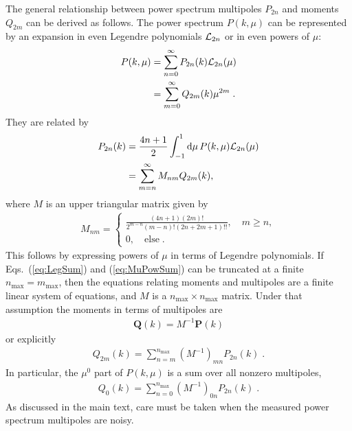 \documentclass[12pt,a4paper]{article}
\begin{document}
The general relationship between power spectrum multipoles $P_{2n}$ and moments $Q_{2m}$ can be derived as follows.
The power spectrum $P(k,\mu)$ can be represented by an expansion in even Legendre polynomials ${\cal L}_{2n}$ or in even powers of $\mu$:
\begin{align}
    P(k,\mu) &= \sum_{n=0}^\infty P_{2n}(k){\cal L}_{2n}(\mu) 
    \label{eq:LegSum}
    \\
    &= \sum_{m=0}^\infty Q_{2m}(k)\mu^{2m}\;.
    \label{eq:MuPowSum}
\end{align}
They are related by 
\begin{align}
    P_{2n}(k) &= \frac{4n+1}{2}\int_{-1}^1\mathrm{d} \mu\,P(k,\mu){\cal L}_{2n}(\mu)\\
    &= \sum_{m=n}^\infty M_{nm}Q_{2m}(k),
\end{align}
where $M$ is an upper triangular matrix given by
\begin{align}
    M_{nm} = 
    \begin{cases}
    \frac{(4n+1)(2m)!}{2^{m-n}(m-n)!(2n+2m+1)!!}, \quad m\ge n,\\
    0, \quad \mbox{else}\;.
    \end{cases}
\end{align}
This follows by expressing powers of $\mu$ in terms of Legendre polynomials.
If  Eqs.~(\ref{eq:LegSum}) and (\ref{eq:MuPowSum}) can be truncated at a finite $n_\mathrm{max}=m_\mathrm{max}$, then the equations relating moments and multipoles are a finite linear system of equations, and $M$ is a $n_\mathrm{max} \times n_\mathrm{max}$ matrix.
Under that assumption the moments in terms of multipoles are 
\begin{align}
    \mathbf{Q}(k) = M^{-1} \mathbf{P}(k)
\end{align}
or explicitly
\begin{align}
    Q_{2m}(k) = \sum_{n=m}^{n_\mathrm{max}} (M^{-1})_{mn} P_{2n}(k)\;.
\end{align}
In particular, the $\mu^0$ part of $P(k,\mu)$ is a sum over all nonzero multipoles,
\begin{align}
    Q_{0}(k) = \sum_{n=0}^{n_\mathrm{max}} (M^{-1})_{0n} P_{2n}(k)\;.
\end{align}
As discussed in the main text, care must be taken when the measured power spectrum multipoles are noisy.




\end{document}
